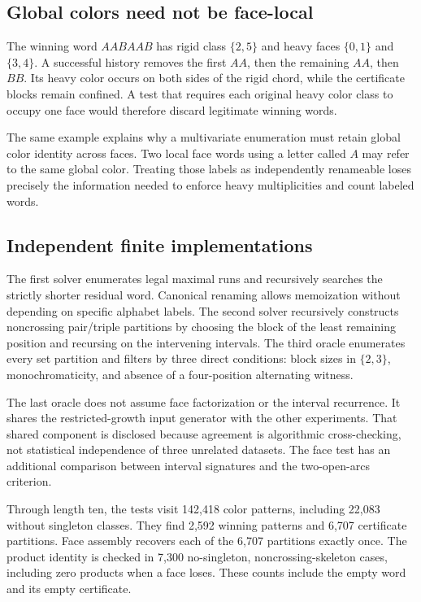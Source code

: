 \documentclass[11pt,reqno]{amsart}
\theoremstyle{definition}
\begin{document}
\subsection{Global colors need not be face-local}
The winning word $AABAAB$ has rigid class $\{2,5\}$ and heavy faces
$\{0,1\}$ and $\{3,4\}$. A successful history removes the first $AA$, then
the remaining $AA$, then $BB$. Its heavy color occurs on both sides of
the rigid chord, while the certificate blocks remain confined. A test that
requires each original heavy color class to occupy one face would therefore
discard legitimate winning words.

The same example explains why a multivariate enumeration must retain
global color identity across faces. Two local face words using a letter
called $A$ may refer to the same global color. Treating those labels as
independently renameable loses precisely the information needed to enforce
heavy multiplicities and count labeled words.

\subsection{Independent finite implementations}
The first solver enumerates legal maximal runs and recursively searches the
strictly shorter residual word. Canonical renaming allows memoization without
depending on specific alphabet labels. The second solver recursively
constructs noncrossing pair/triple partitions by choosing the block of the
least remaining position and recursing on the intervening intervals.
The third oracle enumerates every set partition and filters by three direct
conditions: block sizes in $\{2,3\}$, monochromaticity, and absence of a
four-position alternating witness.

The last oracle does not assume face factorization or the interval recurrence.
It shares the restricted-growth input generator with the other experiments.
That shared component is disclosed because agreement is algorithmic
cross-checking, not statistical independence of three unrelated datasets.
The face test has an additional comparison between interval signatures and
the two-open-arcs criterion.

Through length ten, the tests visit 142,418 color patterns, including 22,083
without singleton classes. They find 2,592 winning patterns and 6,707
certificate partitions. Face assembly recovers each of the 6,707 partitions
exactly once. The product identity is checked in 7,300 no-singleton,
noncrossing-skeleton cases, including zero products when a face loses.
These counts include the empty word and its empty certificate.
\end{document}

